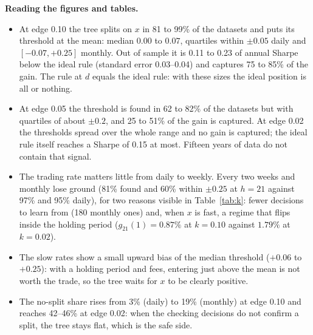 \documentclass[11pt,a4paper]{article}
\newcommand{\1}{\mathbf{1}}
\begin{document}
\textbf{Reading the figures and tables.}
\begin{itemize}\setlength{\itemsep}{1pt}
\item At edge 0.10 the tree splits on $x$ in 81 to 99\% of the datasets and puts its threshold at the mean: median $0.00$ to $0.07$, quartiles within $\pm0.05$ daily and $[-0.07,+0.25]$ monthly. Out of sample it is 0.11 to 0.23 of annual Sharpe below the ideal rule (standard error 0.03--0.04) and captures 75 to 85\% of the gain. The rule at $d$ equals the ideal rule: with these sizes the ideal position is all or nothing.
\item At edge 0.05 the threshold is found in 62 to 82\% of the datasets but with quartiles of about $\pm0.2$, and 25 to 51\% of the gain is captured. At edge 0.02 the thresholds spread over the whole range and no gain is captured; the ideal rule itself reaches a Sharpe of 0.15 at most. Fifteen years of data do not contain that signal.
\item The trading rate matters little from daily to weekly. Every two weeks and monthly lose ground (81\% found and 60\% within $\pm0.25$ at $h=21$ against 97\% and 95\% daily), for two reasons visible in Table~\ref{tab:k}: fewer decisions to learn from (180 monthly ones) and, when $x$ is fast, a regime that flips inside the holding period ($g_{21}(1)=0.87\%$ at $k=0.10$ against $1.79\%$ at $k=0.02$).
\item The slow rates show a small upward bias of the median threshold ($+0.06$ to $+0.25$): with a holding period and fees, entering just above the mean is not worth the trade, so the tree waits for $x$ to be clearly positive.
\item The no-split share rises from 3\% (daily) to 19\% (monthly) at edge 0.10 and reaches 42--46\% at edge 0.02: when the checking decisions do not confirm a split, the tree stays flat, which is the safe side.
\end{itemize}
\end{document}
